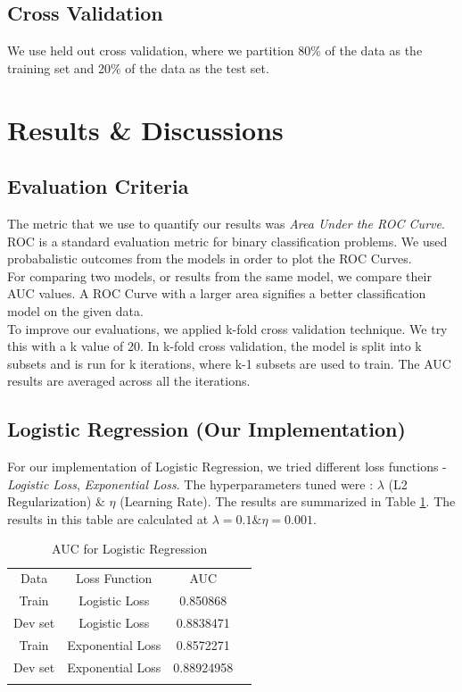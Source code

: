 \documentclass[conference]{IEEEtran}
\numberwithin{equation}{section}
\numberwithin{figure}{section}
\numberwithin{table}{section}
\begin{document}
\subsection{Cross Validation}
We use held out cross validation, where we partition 80\% of the data as the training set and 20\% of the data as the test set. 

\section{Results \& Discussions}
\subsection{Evaluation Criteria}
The metric that we use to quantify our results was \textit{Area Under the ROC Curve}. ROC is a standard evaluation metric for binary classification problems. We used probabalistic outcomes from the models in order to plot the ROC Curves. \\
For comparing two models, or results from the same model, we compare their AUC values. A ROC Curve with a larger area signifies a better classification model on the given data.\\
To improve our evaluations, we applied k-fold cross validation technique. We try this with a k value of 20. In k-fold cross validation, the model is split into k subsets and is run for k iterations, where k-1 subsets are used to train. The AUC results are averaged across all the iterations.

\subsection{Logistic Regression (Our Implementation)}
For our implementation of Logistic Regression, we tried different loss functions - \textit{Logistic Loss}, \textit{Exponential Loss}. The hyperparameters tuned were : \textit{$\lambda$} (L2 Regularization) \& \textit{$\eta$} (Learning Rate). The results are summarized in Table \ref{tab_lr}. The results in this table are calculated at $\lambda = 0.1 \& \eta = 0.001$.

\begin{table}[!htb]
 \centering
 \caption{AUC for Logistic Regression}
 \label{tab_lr}
\begin{tabular}{ c c c c } 
	    \noalign{\smallskip}\hline\noalign{\smallskip}
		Data &  Loss Function & AUC \\
    	   \noalign{\smallskip}\hline\noalign{\smallskip}
		Train &  Logistic Loss & 0.850868\\
		Dev set & Logistic Loss & 0.8838471\\
		\noalign{\smallskip}\hline\noalign{\smallskip}
		Train &  Exponential Loss & 0.8572271\\
		Dev set & Exponential Loss & 0.88924958\\
		\noalign{\smallskip}\hline\noalign{\smallskip}	
  \end{tabular} 
\end{table}
\end{document}
